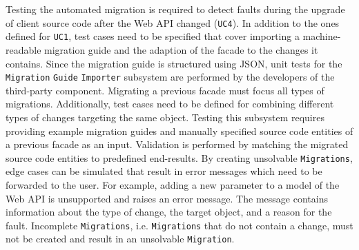 Testing the automated migration is required to detect faults during the upgrade of client source code after the Web API changed (\texttt{UC4}). In addition to the ones defined for \texttt{UC1}, test cases need to be specified that cover importing a machine-readable migration guide and the adaption of the facade to the changes it contains. Since the migration guide is structured using \ac{JSON}, unit tests for the \texttt{Migration} \texttt{Guide} \texttt{Importer} subsystem are performed by the developers of the third-party component. Migrating a previous facade must focus all types of migrations. Additionally, test cases need to be defined for combining different types of changes targeting the same object. Testing this subsystem requires providing example migration guides and manually specified source code entities of a previous facade as an input. Validation is performed by matching the migrated source code entities to predefined end-results. By creating unsolvable \texttt{Migrations}, edge cases can be simulated that result in error messages which need to be forwarded to the user. For example, adding a new parameter to a model of the Web API is unsupported and raises an error message. The message contains information about the type of change, the target object, and a reason for the fault. Incomplete \texttt{Migrations}, i.e. \texttt{Migrations} that do not contain a change, must not be created and result in an unsolvable \texttt{Migration}.

